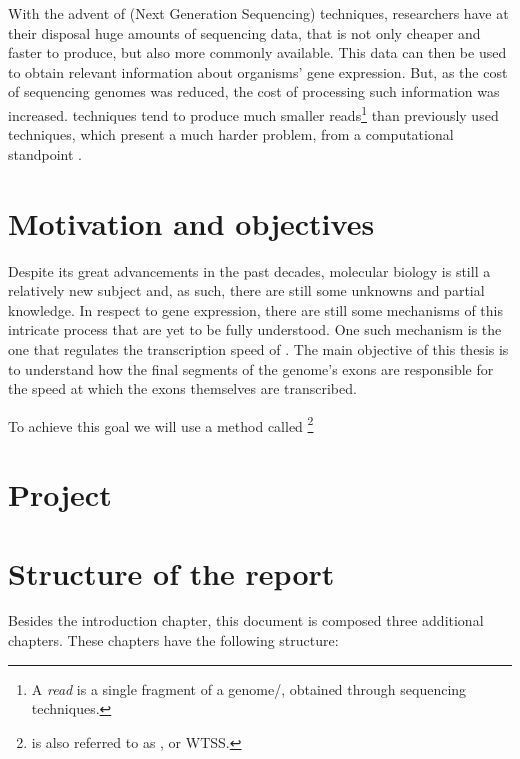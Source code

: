 With the advent of \ngs{} (Next Generation Sequencing) techniques, researchers
have at their disposal huge amounts of sequencing data, that is not only cheaper
and faster to produce, but also more commonly available. This data can then be
used to obtain relevant information about organisms' gene expression. But, as
the cost of sequencing genomes was reduced, the cost of processing such
information was increased. \ngs{} techniques tend to produce much smaller
reads\footnote{A \textit{read} is a single fragment of a genome/\trans, obtained
through sequencing techniques.} than previously used techniques, which present a
much harder problem, from a computational standpoint \cite{Wolf2013}.

\section{Motivation and objectives} \label{sec:motivation}

Despite its great advancements in the past decades, molecular biology is still a
relatively new subject and, as such, there are still some unknowns and partial
knowledge. In respect to gene expression, there are still some mechanisms of
this intricate process that are yet to be fully understood. One such mechanism
is the one that regulates the transcription speed of \rna. The main objective of
this thesis is to understand how the final segments of the genome's exons are
responsible for the speed at which the exons themselves are transcribed.


To achieve this goal we will use a method called \rnaseq{}\footnote{\rnaseq{} is
also referred to as , or WTSS.}

\section{Project} \label{sec:project}

\section{Structure of the report} \label{sec:outline}

Besides the introduction chapter, this document is composed three additional
chapters. These chapters have the following structure:

